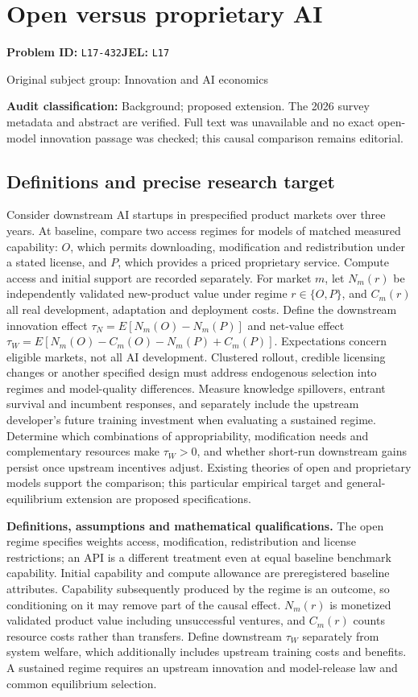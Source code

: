 \documentclass[11pt,a4paper]{article}
\begin{document}
\section*{Open versus proprietary AI}
\textbf{Problem ID:} \texttt{L17-432}\quad \textbf{JEL:} \texttt{L17}\par
\label{problem:OP-0417}
{\sffamily\small\color{muted}Original subject group: Innovation and AI economics\par}
\label{definitions:problem:30007699}
\textbf{Audit classification:} Background; proposed extension. The 2026 survey metadata and abstract are verified. Full text was unavailable and no exact open-model innovation passage was checked; this causal comparison remains editorial.
\subsection*{Definitions and precise research target}
Consider downstream AI startups in prespecified product markets over three years. At baseline, compare two access regimes for models of matched measured capability: \(O\), which permits downloading, modification and redistribution under a stated license, and \(P\), which provides a priced proprietary service. Compute access and initial support are recorded separately. For market \(m\), let \(N_m(r)\) be independently validated new-product value under regime \(r\in\{O,P\}\), and \(C_m(r)\) all real development, adaptation and deployment costs. Define the downstream innovation effect \(\tau_N=E[N_m(O)-N_m(P)]\) and net-value effect \(\tau_W=E[N_m(O)-C_m(O)-N_m(P)+C_m(P)]\). Expectations concern eligible markets, not all AI development. Clustered rollout, credible licensing changes or another specified design must address endogenous selection into regimes and model-quality differences. Measure knowledge spillovers, entrant survival and incumbent responses, and separately include the upstream developer's future training investment when evaluating a sustained regime. Determine which combinations of appropriability, modification needs and complementary resources make \(\tau_W>0\), and whether short-run downstream gains persist once upstream incentives adjust. Existing theories of open and proprietary models support the comparison; this particular empirical target and general-equilibrium extension are proposed specifications.

\textbf{Definitions, assumptions and mathematical qualifications.} The open regime specifies weights access, modification, redistribution and license restrictions; an API is a different treatment even at equal baseline benchmark capability. Initial capability and compute allowance are preregistered baseline attributes. Capability subsequently produced by the regime is an outcome, so conditioning on it may remove part of the causal effect. \(N_m(r)\) is monetized validated product value including unsuccessful ventures, and \(C_m(r)\) counts resource costs rather than transfers. Define downstream \(\tau_W\) separately from system welfare, which additionally includes upstream training costs and benefits. A sustained regime requires an upstream innovation and model-release law and common equilibrium selection.
\end{document}
